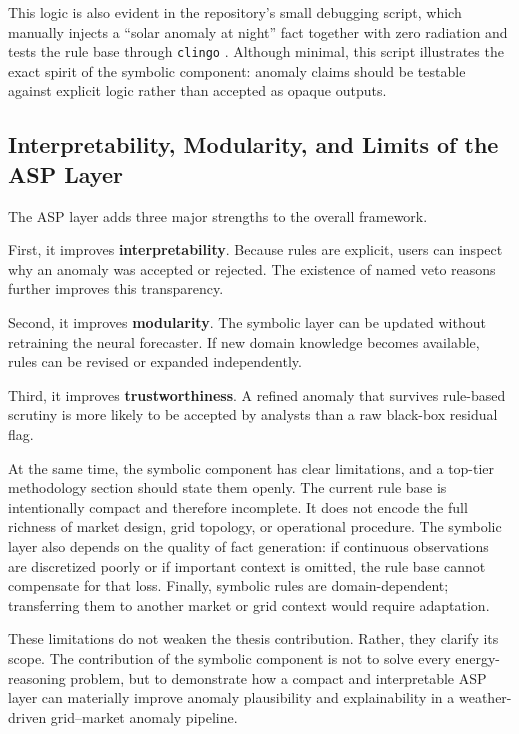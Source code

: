 This logic is also evident in the repository’s small debugging script, which manually injects a ``solar anomaly at night'' fact together with zero radiation and tests the rule base through \texttt{clingo} \cite{repo_thesis_grid_anomaly}. Although minimal, this script illustrates the exact spirit of the symbolic component: anomaly claims should be testable against explicit logic rather than accepted as opaque outputs.

\subsection{Interpretability, Modularity, and Limits of the ASP Layer}

The ASP layer adds three major strengths to the overall framework.

First, it improves \textbf{interpretability}. Because rules are explicit, users can inspect why an anomaly was accepted or rejected. The existence of named veto reasons further improves this transparency.

Second, it improves \textbf{modularity}. The symbolic layer can be updated without retraining the neural forecaster. If new domain knowledge becomes available, rules can be revised or expanded independently.

Third, it improves \textbf{trustworthiness}. A refined anomaly that survives rule-based scrutiny is more likely to be accepted by analysts than a raw black-box residual flag.

At the same time, the symbolic component has clear limitations, and a top-tier methodology section should state them openly. The current rule base is intentionally compact and therefore incomplete. It does not encode the full richness of market design, grid topology, or operational procedure. The symbolic layer also depends on the quality of fact generation: if continuous observations are discretized poorly or if important context is omitted, the rule base cannot compensate for that loss. Finally, symbolic rules are domain-dependent; transferring them to another market or grid context would require adaptation.

These limitations do not weaken the thesis contribution. Rather, they clarify its scope. The contribution of the symbolic component is not to solve every energy-reasoning problem, but to demonstrate how a compact and interpretable ASP layer can materially improve anomaly plausibility and explainability in a weather-driven grid--market anomaly pipeline.

